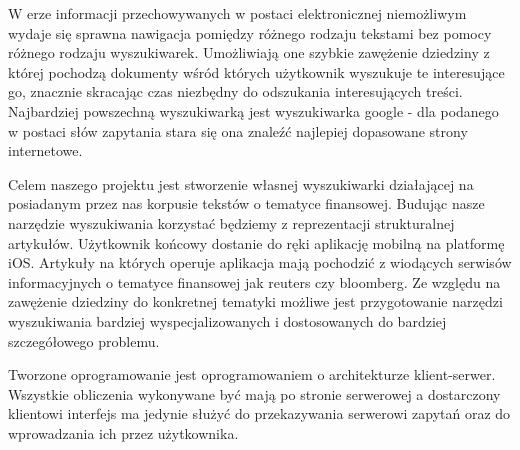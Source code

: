 W erze informacji przechowywanych w postaci elektronicznej niemożliwym wydaje się sprawna nawigacja pomiędzy różnego rodzaju tekstami bez pomocy różnego rodzaju wyszukiwarek. Umożliwiają one szybkie zawężenie dziedziny z której pochodzą dokumenty wśród których użytkownik wyszukuje te interesujące go, znacznie skracając czas niezbędny do odszukania interesujących treści.
Najbardziej powszechną wyszukiwarką jest wyszukiwarka google - dla podanego w postaci słów zapytania stara się ona znaleźć najlepiej dopasowane strony internetowe.

Celem naszego projektu jest stworzenie własnej wyszukiwarki działającej na posiadanym przez nas korpusie tekstów o tematyce finansowej. Budując nasze narzędzie wyszukiwania korzystać będziemy z reprezentacji strukturalnej artykułów. Użytkownik końcowy dostanie do ręki aplikację mobilną na platformę iOS. Artykuły na których operuje aplikacja mają pochodzić z wiodących serwisów informacyjnych o tematyce finansowej jak reuters czy bloomberg. Ze względu na zawężenie dziedziny do konkretnej tematyki możliwe jest przygotowanie narzędzi wyszukiwania bardziej wyspecjalizowanych i dostosowanych do bardziej szczegółowego problemu. 

Tworzone oprogramowanie jest oprogramowaniem o architekturze klient-serwer. Wszystkie obliczenia wykonywane być mają po stronie serwerowej a dostarczony klientowi interfejs ma jedynie służyć do przekazywania serwerowi zapytań oraz do wprowadzania ich przez użytkownika.

